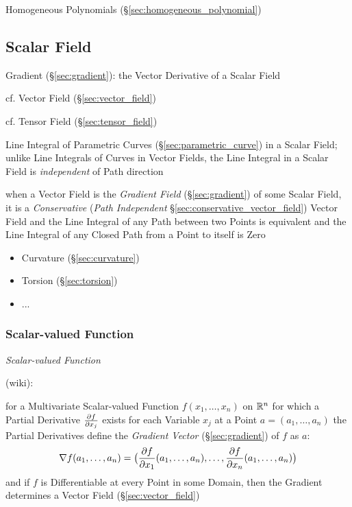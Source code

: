 Homogeneous Polynomials (\S\ref{sec:homogeneous_polynomial})



\subsection{Scalar Field}\label{sec:scalar_field}


Gradient (\S\ref{sec:gradient}): the Vector Derivative of a Scalar Field

cf. Vector Field (\S\ref{sec:vector_field})

cf. Tensor Field (\S\ref{sec:tensor_field})

Line Integral of Parametric Curves (\S\ref{sec:parametric_curve}) in a Scalar
Field; unlike Line Integrals of Curves in Vector Fields, the Line Integral in a
Scalar Field is \emph{independent} of Path direction

when a Vector Field is the \emph{Gradient Field} (\S\ref{sec:gradient}) of some
Scalar Field, it is a \emph{Conservative} (\emph{Path Independent}
\S\ref{sec:conservative_vector_field}) Vector Field and the Line Integral of
any Path between two Points is equivalent and the Line Integral of any Closed
Path from a Point to itself is Zero

\begin{itemize}
  \item Curvature (\S\ref{sec:curvature})
  \item Torsion (\S\ref{sec:torsion})
  \item ...
\end{itemize}



\subsubsection{Scalar-valued Function}\label{sec:scalar_function}

\emph{Scalar-valued Function}

(wiki):

for a Multivariate Scalar-valued Function $f(x_1, \ldots, x_n)$ on $\mathbb{R}^n$
for which a Partial Derivative $\frac{\partial{f}}{\partial{x_j}}$ exists for each Variable $x_j$
at a Point $a = (a_1, \ldots, a_n)$ the Partial Derivatives define the
\emph{Gradient Vector} (\S\ref{sec:gradient}) of $f$ as $a$:
\[
  \nabla{f}(a_1, \ldots, a_n) = \big(
    \frac{\partial{f}}{\partial{x_1}}(a_1, \ldots, a_n), \ldots, \frac{\partial{f}}{\partial{x_n}}(a_1, \ldots, a_n)
  \big)
\]
and if $f$ is Differentiable at every Point in some Domain, then the Gradient
determines a Vector Field (\S\ref{sec:vector_field})



